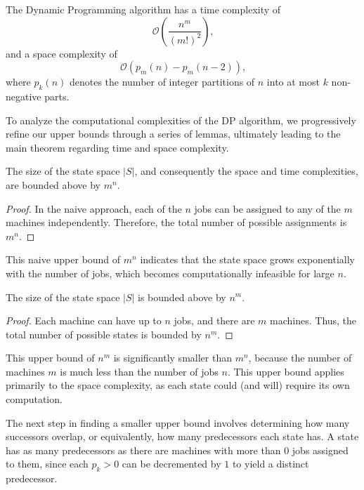 \begin{theorem}
    \label{thm:dp-time-space-complexity}
    The Dynamic Programming algorithm has a time complexity of
    \[
        \mathcal{O}\left( \frac{n^m}{(m!)^2} \right)\text{,}
    \]
    and a space complexity of
    \[
        \mathcal{O}\left( p_m(n) - p_m(n-2) \right)\text{,}
    \]
    where $p_k(n)$ denotes the number of integer partitions of $n$ into at most $k$ non-negative parts.
\end{theorem}

To analyze the computational complexities of the DP algorithm, we progressively refine our upper bounds through a series of lemmas, ultimately leading to the main theorem regarding time and space complexity.

\begin{lemma}
    The size of the state space $|S|$, and consequently the space and time complexities, are bounded above by $m^n$.
\end{lemma}

\begin{proof}
    In the naive approach, each of the $n$ jobs can be assigned to any of the $m$ machines independently. Therefore, the total number of possible assignments is $m^n$.
\end{proof}

This naive upper bound of $m^n$ indicates that the state space grows exponentially with the number of jobs, which becomes computationally infeasible for large $n$.

\begin{lemma}
    The size of the state space $|S|$ is bounded above by $n^m$.
\end{lemma}

\begin{proof}
    Each machine can have up to $n$ jobs, and there are $m$ machines. Thus, the total number of possible states is bounded by $n^m$.
\end{proof}

This upper bound of $n^m$ is significantly smaller than $m^n$, because the number of machines $m$ is much less than the number of jobs $n$. This upper bound applies primarily to the space complexity, as each state could (and will) require its own computation.

The next step in finding a smaller upper bound involves determining how many successors overlap, or equivalently, how many predecessors each state has. A state has as many predecessors as there are machines with more than $0$ jobs assigned to them, since each $p_k > 0$ can be decremented by $1$ to yield a distinct predecessor.

